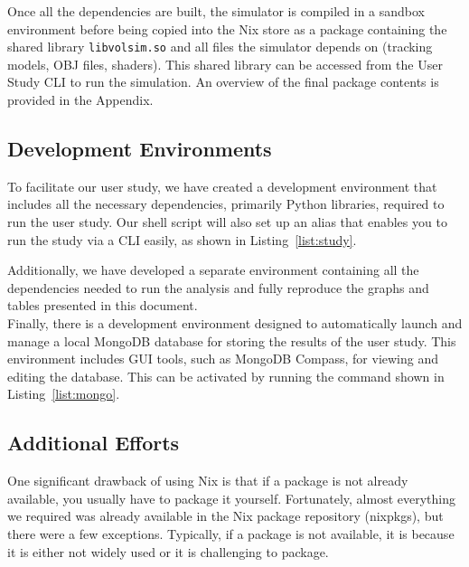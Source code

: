 Once all the dependencies are built, the simulator is compiled in a sandbox environment before being copied into the Nix store as a package containing the shared library \texttt{libvolsim.so} and all files the simulator depends on (tracking models, OBJ files, shaders). This shared library can be accessed from the User Study CLI to run the simulation. An overview of the final package contents is provided in the Appendix.

\subsection{Development Environments}

To facilitate our user study, we have created a development environment that includes all the necessary dependencies, primarily Python libraries, required to run the user study. Our shell script will also set up an alias that enables you to run the study via a CLI easily, as shown in Listing~\ref{list:study}.


Additionally, we have developed a separate environment containing all the dependencies needed to run the analysis and fully reproduce the graphs and tables presented in this document. \\

Finally, there is a development environment designed to automatically launch and manage a local MongoDB database for storing the results of the user study. This environment includes GUI tools, such as MongoDB Compass, for viewing and editing the database. This can be activated by running the command shown in Listing~\ref{list:mongo}.


\subsection{Additional Efforts}

One significant drawback of using Nix is that if a package is not already available, you usually have to package it yourself. Fortunately, almost everything we required was already available in the Nix package repository (nixpkgs), but there were a few exceptions. Typically, if a package is not available, it is because it is either not widely used or it is challenging to package.

